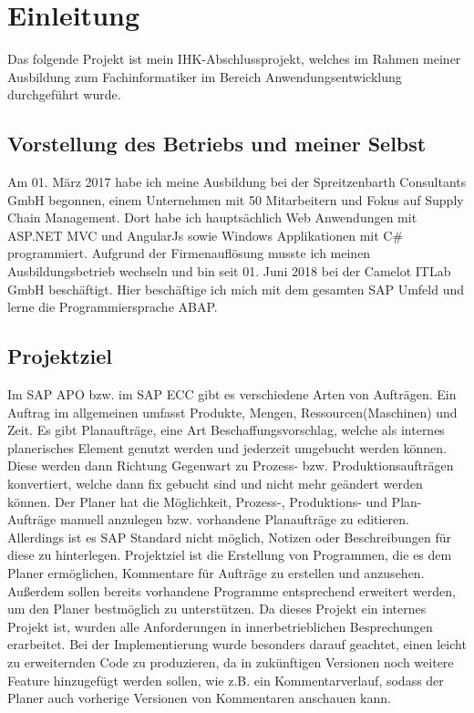 \section{Einleitung}
\label{sec:Einleitung}
Das folgende Projekt ist mein IHK-Abschlussprojekt, welches im Rahmen meiner Ausbildung zum Fachinformatiker im Bereich Anwendungsentwicklung durchgeführt wurde.

\subsection{Vorstellung des Betriebs und meiner Selbst} 
\label{sec:Vorstellung des Betriebs und meiner Selbst}
Am 01. März 2017 habe ich meine Ausbildung bei der Spreitzenbarth Consultants GmbH begonnen, einem Unternehmen mit 50 Mitarbeitern und Fokus auf Supply Chain Management. Dort habe ich hauptsächlich Web Anwendungen mit ASP.NET MVC und AngularJs sowie Windows Applikationen mit C\# programmiert. Aufgrund der Firmenauflösung musste ich meinen Ausbildungsbetrieb wechseln und bin seit 01. Juni 2018 bei der Camelot ITLab GmbH beschäftigt. Hier beschäftige ich mich mit dem gesamten SAP Umfeld und lerne die Programmiersprache \ac{ABAP}.

\subsection{Projektziel} 
\label{sec:Projektziel}
Im SAP \ac{APO} bzw. im SAP \ac{ECC} gibt es verschiedene Arten von Aufträgen. Ein Auftrag im allgemeinen umfasst Produkte, Mengen, Ressourcen(Maschinen) und Zeit. Es gibt Planaufträge, eine Art Beschaffungsvorschlag, welche als internes planerisches Element genutzt werden und jederzeit umgebucht werden können. Diese werden dann Richtung Gegenwart zu  Prozess- bzw. Produktionsaufträgen konvertiert, welche dann fix gebucht sind und nicht mehr geändert werden können. Der Planer hat die Möglichkeit, Prozess-, Produktions- und Plan-Aufträge manuell anzulegen bzw. vorhandene Planaufträge zu editieren. Allerdings ist es SAP Standard nicht möglich, Notizen oder Beschreibungen für diese zu hinterlegen. Projektziel ist die Erstellung von Programmen, die es dem Planer ermöglichen, Kommentare	für Aufträge zu erstellen und anzusehen. Außerdem sollen bereits vorhandene Programme entsprechend erweitert werden, um den Planer bestmöglich zu unterstützen. Da dieses Projekt ein internes Projekt ist, wurden alle Anforderungen in innerbetrieblichen Besprechungen erarbeitet. Bei der Implementierung wurde besonders darauf geachtet, einen leicht zu erweiternden Code zu produzieren, da in zukünftigen Versionen noch weitere Feature hinzugefügt werden sollen, wie z.B. ein Kommentarverlauf, sodass der Planer auch vorherige Versionen von Kommentaren anschauen kann. 

